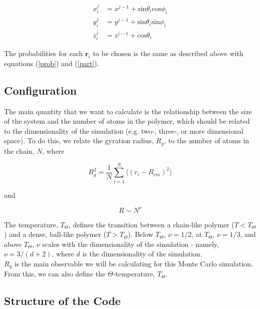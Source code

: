 \documentclass{article}
\begin{document}
\begin{multicols}{2}
\begin{equation}
\begin{split}
x^{j}_i & = x^{j-1} + \mathrm{sin}\theta _i \mathrm{cos}\phi _i \\
y^{j}_i & = y^{j-1} + \mathrm{sin} \theta _i \mathrm{sin} \phi _i \\
z^{j}_i & = z^{j-1} + \mathrm{cos} \theta _i
\end{split}
\end{equation}

\noindent The probabilities for each $\textbf{r}_i$ to be chosen is the same as described above with equations (\ref{prob}) and (\ref{part}).

\subsection{Configuration}

The main quantity that we want to calculate is the relationship between the size of the system and the number of atoms in the polymer, which should be related to the dimensionality of the simulation (e.g. two-, three-, or more dimensional space).  To do this, we relate the gyration radius, $R_g$, to the number of atoms in the chain, $N$, where 

\begin{equation}
\label{rg}
R_g^2 = \frac{1}{N} \sum \limits _{i=1}^{N} \langle (r_i - R_{cm})^2 \rangle
\end{equation} 

\noindent and 

\begin{equation}
\label{RNcomparison}
R \sim N^{\nu}
\end{equation}

The temperature, $T_{\Theta}$, defines the transition between a chain-like polymer ($T<T_{\Theta}$) and a dense, ball-like polymer ($T>T_{\Theta}$).  Below $T_{\Theta}$, $\nu = 1/ 2$, at $T_{\Theta}$, $\nu = 1/3$, and above $T_{\Theta}$, $\nu$ scales with the dimensionality of the simulation - namely, $\nu = 3/(d+2)$, where $d$ is the dimensionality of the simulation.  \cite{PhilNotes}\\

$R_g$ is the main observable we will be calculating for this Monte Carlo simulation.  From this, we can also define the $\Theta $-temperature, $T_{\Theta}$.

\subsection{Structure of the Code}


\end{multicols}
\end{document}
